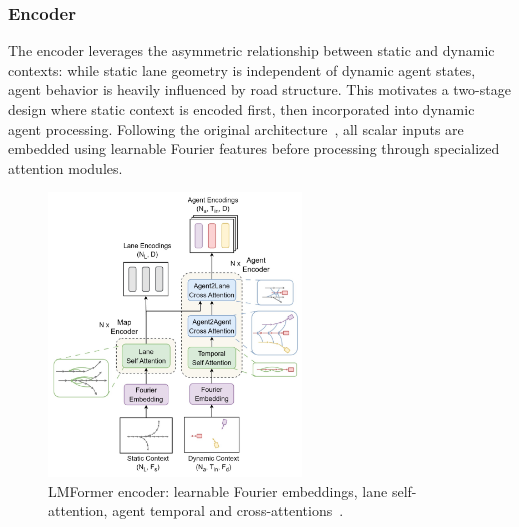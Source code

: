 \subsubsection*{Encoder}
The encoder leverages the asymmetric relationship between static and dynamic contexts: while static lane geometry is independent of dynamic agent states, agent behavior is heavily influenced by road structure. This motivates a two-stage design where static context is encoded first, then incorporated into dynamic agent processing. Following the original architecture~\cite{lmformerYadav2025}, all scalar inputs are embedded using learnable Fourier features before processing through specialized attention modules.
\begin{figure}[H]
  \centering
  \includegraphics[width=0.6\textwidth]{figures/lmformer_arch_encorder.png}
  \caption{LMFormer encoder: learnable Fourier embeddings, lane self-attention, agent temporal and cross-attentions~\cite{lmformerYadav2025}.}
  \label{fig:lmformer_arch_encoder}
\end{figure}

